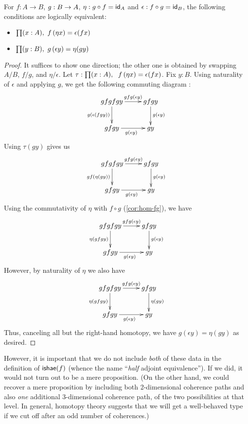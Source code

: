 \begin{lem}\label{lem:coh-equiv}
For $f : A \to B$, $g:B\ra A$, $\eta: g \circ f = \idfunc[A]$ and $\epsilon:f \circ g = \idfunc[B]$, the following conditions are logically equivalent:
\begin{itemize}
\item $\prd{x:A} \map{f}{\eta x} = \epsilon(fx)$
\item $\prd{y:B} \map{g}{\epsilon y} = \eta(gy)$
\end{itemize}
\end{lem}
\begin{proof}
  It suffices to show one direction; the other one is obtained by swapping $A/B$, $f/g$, and $\eta/\epsilon$.
  Let $\tau : \prd{x:A}\;\map{f}{\eta x} = \epsilon(fx)$.
  Fix $y : B$.
  Using naturality of $\epsilon$ and applying $g$, we get the following commuting diagram :
\[\uppercurveobject{{ }}\lowercurveobject{{ }}\twocellhead{{ }}
  \xymatrix{gfgfgy \ar^-{gfg(\epsilon y)}[r] \ar_{g(\epsilon (fgy))}[d] & gfgy \ar^{g(\epsilon y)}[d] \\ gfgy \ar_{g(\epsilon y)}[r] & gy
  }\]
Using $\tau(gy)$ gives us
\[\uppercurveobject{{ }}\lowercurveobject{{ }}\twocellhead{{ }}
  \xymatrix{gfgfgy \ar^-{gfg(\epsilon y)}[r] \ar_{gf(\eta (gy))}[d] & gfgy \ar^{g(\epsilon y)}[d] \\ gfgy \ar_{g(\epsilon y)}[r] & gy
  }\]
Using the commutativity of $\eta$ with $f \circ g$ (\autoref{cor:hom-fg}), we have
\[\uppercurveobject{{ }}\lowercurveobject{{ }}\twocellhead{{ }}
  \xymatrix{gfgfgy \ar^-{gfg(\epsilon y)}[r] \ar_{\eta (gfgy)}[d] & gfgy \ar^{g(\epsilon y)}[d] \\ gfgy \ar_{g(\epsilon y)}[r] & gy
  }\]
However, by naturality of $\eta$ we also have
\[\uppercurveobject{{ }}\lowercurveobject{{ }}\twocellhead{{ }}
  \xymatrix{gfgfgy \ar^-{gfg(\epsilon y)}[r] \ar_{\eta (gfgy)}[d] & gfgy \ar^{\eta(gy)}[d] \\ gfgy \ar_{g(\epsilon y)}[r] & gy 
  }\]
Thus, canceling all but the right-hand homotopy, we have $g(\epsilon y) = \eta(g y)$ as desired.
\end{proof}

However, it is important that we do not include \emph{both} of these data in the definition of $\ishae (f)$ (whence the name ``\emph{half} adjoint equivalence'').
If we did, it would not turn out to be a mere proposition.
(On the other hand, we could recover a mere proposition by including both 2-dimensional coherence paths and also \emph{one} additional 3-dimensional coherence path, of the two possibilities at that level.
In general, homotopy theory suggests that we will get a well-behaved type if we cut off after an odd number of coherences.)

